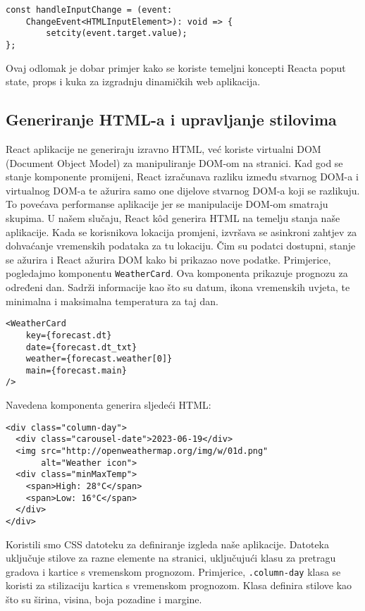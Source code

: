 \documentclass[times, utf8, zavrsni]{fer}
\begin{document}
\begin{verbatim}
const handleInputChange = (event: 
    ChangeEvent<HTMLInputElement>): void => {
        setcity(event.target.value);
};
\end{verbatim}
Ovaj odlomak je dobar primjer kako se koriste temeljni koncepti Reacta poput state, props i kuka za izgradnju dinamičkih web aplikacija.

\subsection{Generiranje HTML-a i upravljanje stilovima}

React aplikacije ne generiraju izravno HTML, već koriste virtualni DOM (Document Object Model) za manipuliranje DOM-om na stranici. Kad god se stanje komponente promijeni, React izračunava razliku između stvarnog DOM-a i virtualnog DOM-a te ažurira samo one dijelove stvarnog DOM-a koji se razlikuju. To povećava performanse aplikacije jer se manipulacije DOM-om smatraju skupima. U našem slučaju, React kôd generira HTML na temelju stanja naše aplikacije. Kada se korisnikova lokacija promjeni, izvršava se asinkroni zahtjev za dohvaćanje vremenskih podataka za tu lokaciju. Čim su podatci dostupni, stanje se ažurira i React ažurira DOM kako bi prikazao nove podatke. Primjerice, pogledajmo komponentu \texttt{WeatherCard}. Ova komponenta prikazuje prognozu za određeni dan. Sadrži informacije kao što su datum, ikona vremenskih uvjeta, te minimalna i maksimalna temperatura za taj dan.

\begin{verbatim}
<WeatherCard 
    key={forecast.dt} 
    date={forecast.dt_txt} 
    weather={forecast.weather[0]} 
    main={forecast.main} 
/>
\end{verbatim}
\newpage
Navedena komponenta generira sljedeći HTML:
\begin{verbatim}
<div class="column-day">
  <div class="carousel-date">2023-06-19</div>
  <img src="http://openweathermap.org/img/w/01d.png" 
       alt="Weather icon">
  <div class="minMaxTemp">
    <span>High: 28°C</span>
    <span>Low: 16°C</span>
  </div>
</div>
\end{verbatim}

Koristili smo CSS datoteku za definiranje izgleda naše aplikacije. Datoteka uključuje stilove za razne elemente na stranici, uključujući klasu za pretragu gradova i kartice s vremenskom prognozom. Primjerice, \texttt{.column-day} klasa se koristi za stilizaciju kartica s vremenskom prognozom. Klasa definira stilove kao što su širina, visina, boja pozadine i margine.
\end{document}
